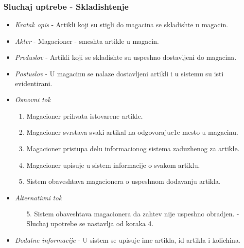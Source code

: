 \documentclass[10 pt]{article}
\begin{document}
	\subsubsection{Sluchaj uptrebe - Skladishtenje}
		
		\begin{itemize}
			\item\textit{Kratak opis} - Artikli koji su stigli do magacina se skladishte u magacin.
			
			\item\textit{Akter} - Magacioner - smeshta artikle u magacin.

			
			\item\textit{Preduslov} - Artikli koji se skladishte su uspeshno dostavljeni do magacina.

			
			\item\textit{Postuslov} - U magacinu se nalaze dostavljeni artikli i u sistemu su isti evidentirani.

			
			\item\textit{Osnovni tok}
				\begin{enumerate}
					\item Magacioner prihvata istovarene artikle.

					\item Magacioner svrstava svaki artikal na odgovorajuc1e mesto u magacinu.

					\item Magacioner pristupa delu informacionog sistema zaduzhenog za artikle.

					\item Magacioner upisuje u sistem informacije o svakom artiklu.

					\item Sistem obaveshtava magacionera o uspeshnom dodavanju artikla.

				\end{enumerate} 

		
			\item\textit{Alternativni tok}
				\begin{enumerate}
					\item [5.] Sistem obaveshtava magacionera da zahtev nije uspeshno obradjen.
- Sluchaj upotrebe se nastavlja od koraka 4.

				\end{enumerate}
			
			\item\textit{Dodatne informacije} - U sistem se upisuje ime artikla, id artikla i kolichina.

			
		\end{itemize}
	
\end{document}
